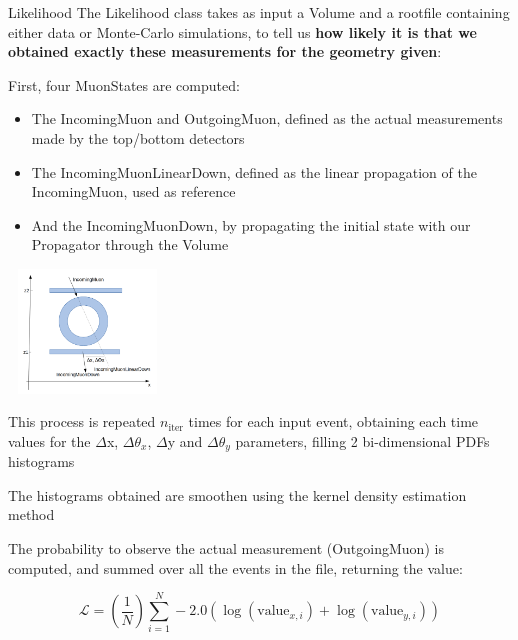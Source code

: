 \documentclass[8 pt]{beamer}
\begin{document}
\begin{frame}{Likelihood}
\justifying
The Likelihood class takes as input a Volume and a rootfile containing either data or Monte-Carlo simulations, to tell us \textbf{how likely it is that we obtained exactly these measurements for the geometry given}: \begin{itemize}

\begin{minipage}[c]{.58\textwidth}
\item First, four MuonStates are computed:
	\begin{itemize}
	\justifying
	\item The IncomingMuon and OutgoingMuon, defined as the actual measurements made by the top/bottom detectors
	\item The IncomingMuonLinearDown, defined as the linear propagation of the IncomingMuon, used as reference
	\item And the IncomingMuonDown, by propagating the initial state with our Propagator through the Volume
	\end{itemize}
\end{minipage}
\begin{minipage}[c]{.36\textwidth}
\includegraphics[width=4.2cm, height=3.3cm]{figs/parameters.png}
\end{minipage}

\justifying
\item This process is repeated $n_{\text{iter}}$ times for each input event, obtaining each time values for the $\Delta$x, $\Delta \theta_x$, $\Delta$y and $\Delta \theta_y$ parameters, filling 2 bi-dimensional PDFs histograms
\item The histograms obtained are smoothen using the kernel density estimation method
\item The probability to observe the actual measurement (OutgoingMuon) is computed, and summed over all the events in the file, returning the value:

\begin{equation*}
\label{eq:totallikelihood}
\mathcal{L} = \left( \frac{1}{N} \right) \sum_{i = 1}^N -2.0 \left ( \log(\text{value}_{x, i}) + \log(\text{value}_{y, i}) \right)
\end{equation*}
\end{itemize} \vfill
\end{frame}
\end{document}
